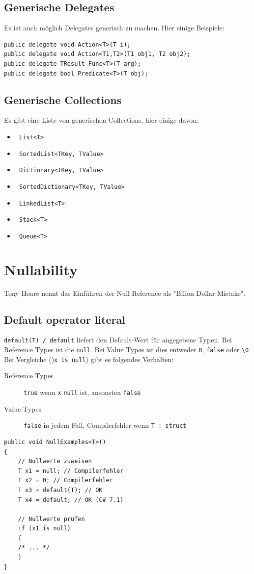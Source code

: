 \documentclass[
a4paper,
oneside,
10pt,
fleqn,
headsepline,
toc=listofnumbered, 
bibliography=totocnumbered]{scrartcl}
\let\stdsection\section
\renewcommand\section{\clearpage\stdsection}
\begin{document}
\subsection{Generische Delegates}
Es ist auch möglich Delegates generisch zu machen. Hier einige Beispiele:
\begin{lstlisting}
public delegate void Action<T>(T i); 
public delegate void Action<T1,T2>(T1 obj1, T2 obj2); 
public delegate TResult Func<T>(T arg); 
public delegate bool Predicate<T>(T obj); 
\end{lstlisting}

\subsection{Generische Collections}
Es gibt eine Liste von generischen Collections, hier einige davon:

\begin{itemize}
	\item \lstinline| List<T> |
	\item \lstinline| SortedList<TKey, TValue> |
	\item \lstinline| Dictionary<TKey, TValue> |
	\item \lstinline| SortedDictionary<TKey, TValue> |
	\item \lstinline| LinkedList<T> |
	\item \lstinline| Stack<T>|
	\item \lstinline| Queue<T>|
\end{itemize}

\section{Nullability}
Tony Hoare nennt das Einführen der Null Reference als "Bilion-Dollar-Mistake".

\subsection{Default operator \/ literal}
\lstinline|default(T) / default| liefert den Default-Wert für angegebene Typen. Bei Reference Types ist die \lstinline|null|. Bei Value Types ist dies entweder \lstinline|0|, \lstinline|false| oder \lstinline|\0|. Bei Vergleiche ()\lstinline|x is null|) gibt es folgendes Verhalten:
\begin{description}
	\item[Reference Types] \lstinline|true| wenn \lstinline|x| \lstinline|null| ist, ansonsten \lstinline|false|
	\item[Value Types] \lstinline|false| in jedem Fall. Compilerfehler wenn \lstinline|T : struct|
\end{description}
\begin{lstlisting}
public void NullExamples<T>()
{
	// Nullwerte zuweisen
	T x1 = null; // Compilerfehler
	T x2 = 0; // Compilerfehler
	T x3 = default(T); // OK
	T x4 = default; // OK (C# 7.1)

	// Nullwerte prüfen
	if (x1 is null)
	{
	/* ... */
	}
}
\end{lstlisting}
\end{document}
